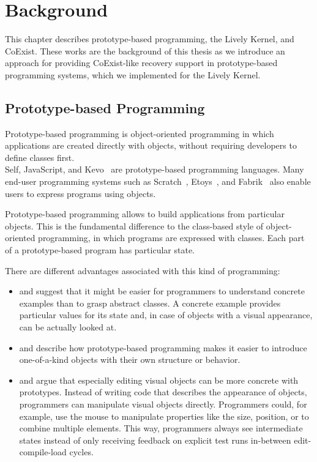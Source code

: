 \chapter{Background} \label{chapter:BACKGROUND}

This chapter describes prototype-based programming, the Lively Kernel, and CoExist.
These works are the background of this thesis as we introduce an approach for providing CoExist-like recovery support in prototype-based programming systems, which we implemented for the Lively Kernel.

\section{Prototype-based Programming}

Prototype-based programming is object-oriented programming in which applications are created directly with objects, without requiring developers to define classes first.\\
Self, JavaScript, and Kevo~\cite{Taivalsaari1992Kevo} are prototype-based programming languages.
Many end-user programming systems such as Scratch~\cite{Maloney2010SPL}, Etoys~\cite{Kay2005Etoys}, and Fabrik~\cite{Ingalls1988FVP} also enable users to express programs using objects.

Prototype-based programming allows to build applications from particular objects.
This is the fundamental difference to the class-based style of object-oriented programming, in which programs are expressed with classes.
Each part of a prototype-based program has particular state.

There are different advantages associated with this kind of programming:
\begin{itemize}
    \item \cite{Taivalsaari1996CVP} and \cite{Lieberman1986UPO} suggest that it might be easier for programmers to understand concrete examples than to grasp abstract classes. A concrete example provides particular values for its state and, in case of objects with a visual appearance, can be actually looked at.
    \item \cite{Ungar1987SPS} and \cite{Borning1986CVP} describe how prototype-based programming makes it easier to introduce one-of-a-kind objects with their own structure or behavior.
    \item \cite{Borning1986CVP} and \cite{Maloney1995Mor} argue that especially editing visual objects can be more concrete with prototypes. Instead of writing code that describes the appearance of objects, programmers can manipulate visual objects directly. Programmers could, for example, use the mouse to manipulate properties like the size, position, or to combine multiple elements. This way, programmers always see intermediate states instead of only receiving feedback on explicit test runs in-between edit-compile-load cycles. 
\end{itemize}

